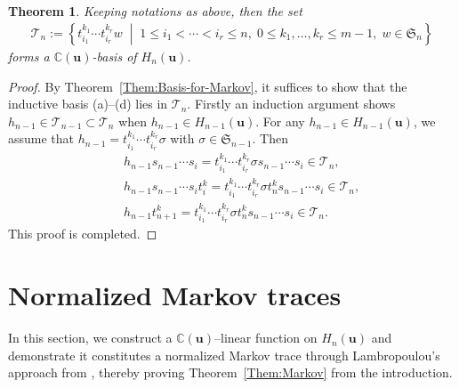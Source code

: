 \documentclass[a4paper, oneside]{amsart}
\numberwithin{equation}{section}
\newtheorem{theorem}[equation]{Theorem}
\theoremstyle{definition}
\theoremstyle{remark}
\begin{document}
\begin{theorem}\label{Them:t-basis}Keeping notations as above, then the set
\begin{align*}
\mathscr{T}_n := \left\{ t_{i_1}^{k_1} \cdots t_{i_r}^{k_r} w \;\middle|\; 1 \leq i_1 < \cdots < i_r \leq n,\; 0 \leq k_1, \ldots, k_r\leq m-1,\; w \in \mathfrak{S}_n \right\}
\end{align*}
forms a \(\mathbb{C}(\boldsymbol{u})\)-basis of \(H_n(\boldsymbol{u})\).
\end{theorem}
\begin{proof}
By Theorem~\ref{Them:Basis-for-Markov}, it suffices to show that the inductive basis (a)--(d) lies in \(\mathscr{T}_n\). Firstly an induction argument shows  $h_{n-1} \in \mathscr{T}_{n-1} \subset \mathscr{T}_n$ when $h_{n-1} \in H_{n-1}(\boldsymbol{u})$.  For any $h_{n-1}\in H_{n-1}(\boldsymbol{u})$,  we assume that  $h_{n-1} = t_{i_1}^{k_1} \cdots t_{i_r}^{k_r} \sigma$ with $\sigma\in \mathfrak{S}_{n-1}$. Then
\begin{eqnarray*}
 && h_{n-1}s_{n-1} \cdots s_i= t_{i_1}^{k_1} \cdots t_{i_r}^{k_r} \sigma s_{n-1} \cdots s_i \in \mathscr{T}_n,\\
 &&h_{n-1}s_{n-1} \cdots s_i t_i^k=t_{i_1}^{k_1} \cdots t_{i_r}^{k_r} \sigma t_{n}^k s_{n-1} \cdots s_i \in \mathscr{T}_n,\\
&&h_{n-1}t_{n+1}^k=t_{i_1}^{k_1} \cdots t_{i_r}^{k_r} \sigma t_{n}^k s_{n-1} \cdots s_i \in \mathscr{T}_n.
\end{eqnarray*}
This proof is completed.
\end{proof}
\section{Normalized Markov traces}\label{Sec:Markov-traces}
In this section, we construct a $\mathbb{C}(\boldsymbol{u})$--linear function on $H_n(\boldsymbol{u})$ and demonstrate it constitutes a normalized Markov trace through Lambropoulou's approach from \cite{L}, thereby proving Theorem~\ref{Them:Markov} from the introduction.
\end{document}
